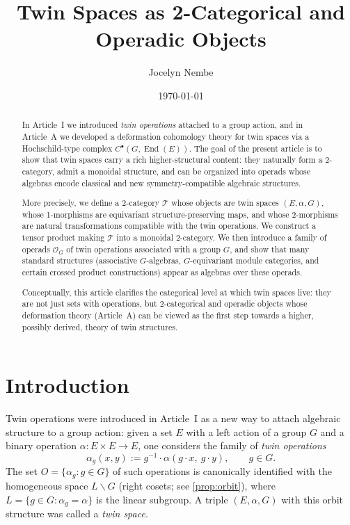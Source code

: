 \documentclass[11pt,a4paper]{article}
\title{\textbf{Twin Spaces as 2-Categorical and Operadic Objects}}
\author{Jocelyn Nembe}
\date{\today}
\numberwithin{equation}{section}
\DeclareMathOperator{\End}{End}
\newcommand{\TwinSpace}{(E,\alpha,G)}
\newcommand{\Twin}{\mathcal{T}}
\newcommand{\TwinOrbit}{O}
\newcommand{\LinearSubgroup}{L}
\newcommand{\Cochain}{C}
\begin{document}
	
	\maketitle
	
	\begin{abstract}
		In Article~I we introduced \emph{twin operations} attached to a group action, and in Article~A we developed 
		a deformation cohomology theory for twin spaces via a Hochschild-type complex $\Cochain^\bullet(G,\End(E))$.
		The goal of the present article is to show that twin spaces carry a rich higher-structural content:
		they naturally form a 2-category, admit a monoidal structure, and can be organized into operads whose algebras
		encode classical and new symmetry-compatible algebraic structures.
		
		More precisely, we define a 2-category $\Twin$ whose objects are twin spaces $\TwinSpace$, 
		whose 1-morphisms are equivariant structure-preserving maps, and whose 2-morphisms are natural
		transformations compatible with the twin operations.
		We construct a tensor product making $\Twin$ into a monoidal 2-category.
		We then introduce a family of operads $\mathcal{O}_G$ of twin operations associated with a group $G$,
		and show that many standard structures (associative $G$-algebras, $G$-equivariant module categories, 
		and certain crossed product constructions) appear as algebras over these operads.
		
		Conceptually, this article clarifies the categorical level at which twin spaces live:
		they are not just sets with operations, but 2-categorical and operadic objects whose deformation theory 
		(Article~A) can be viewed as the first step towards a higher, possibly derived, theory of twin structures.
	\end{abstract}
	
	\tableofcontents
	
	\section{Introduction}
	\label{sec:intro}
	
	Twin operations were introduced in Article~I as a new way to attach algebraic structure to a group action:
	given a set $E$ with a left action of a group $G$ and a binary operation $\alpha : E\times E\to E$, one considers
	the family of \emph{twin operations}
	\begin{equation}\label{eq:twin-def-B}
		\alpha_g(x,y) := g^{-1}\cdot \alpha(g\cdot x,\ g\cdot y), \qquad g\in G.
	\end{equation}
	The set $\TwinOrbit=\{\alpha_g : g\in G\}$ of such operations is canonically identified with the homogeneous space
	$\LinearSubgroup\backslash G$ (right cosets; see \cref{prop:orbit}), where $\LinearSubgroup=\{g\in G : \alpha_g=\alpha\}$ is the linear subgroup.
	A triple $\TwinSpace$ with this orbit structure was called a \emph{twin space}.
	
\end{document}
